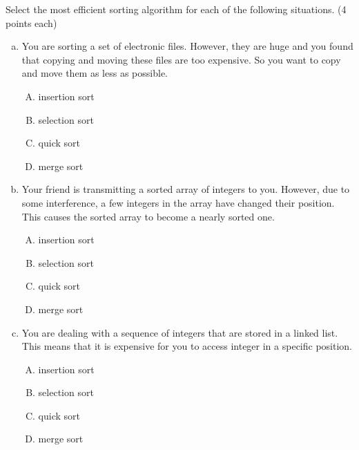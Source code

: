 \documentclass[11pt]{exam}
\begin{document}
Select the most efficient sorting algorithm for each of the following situations. (4 points each)
\begin{enumerate}[(a)]
    \item You are sorting a set of electronic files. However, they are huge and you found that copying and moving these files are too expensive. So you want to copy and move them as less as possible.
    \begin{enumerate}[A)]
        \item insertion sort
        \item selection sort
        \item quick sort
        \item merge sort
    \end{enumerate}
    \begin{solution}
        
    \end{solution}
    
    \item Your friend is transmitting a sorted array of integers to you. However, due to some interference, a few integers in the array have changed their position. This causes the sorted array to become a nearly sorted one.
    \begin{enumerate}[A)]
        \item insertion sort
        \item selection sort
        \item quick sort
        \item merge sort
    \end{enumerate}
    \begin{solution}
       
    \end{solution}
    
    \item You are dealing with a sequence of integers that are stored in a linked list. This means that it is expensive for you to access integer in a specific position.
    \begin{enumerate}[A)]
        \item insertion sort
        \item selection sort
        \item quick sort
        \item merge sort
    \end{enumerate}
    \begin{solution}
        
    \end{solution}
    

\end{enumerate}
\end{document}
